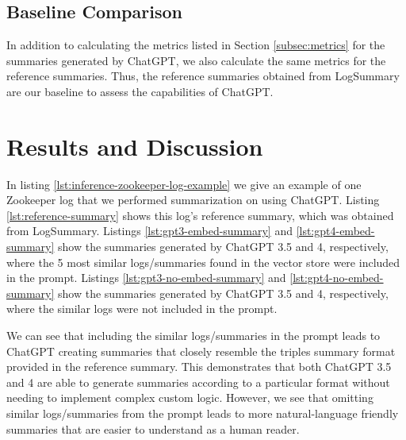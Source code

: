 \documentclass[conference]{IEEEtran}
\begin{document}
\subsection{Baseline Comparison}

In addition to calculating the metrics listed in Section \ref{subsec:metrics} for the summaries generated by ChatGPT, we also calculate the same metrics for the reference summaries. Thus, the reference summaries obtained from LogSummary are our baseline to assess the capabilities of ChatGPT.

\section{Results and Discussion}

In listing \ref{lst:inference-zookeeper-log-example} we give an example of one Zookeeper log that we performed summarization on using ChatGPT. Listing \ref{lst:reference-summary} shows this log's reference summary, which was obtained from LogSummary. Listings \ref{lst:gpt3-embed-summary} and \ref{lst:gpt4-embed-summary} show the summaries generated by ChatGPT 3.5 and 4, respectively, where the 5 most similar logs/summaries found in the vector store were included in the prompt. Listings \ref{lst:gpt3-no-embed-summary} and \ref{lst:gpt4-no-embed-summary} show the summaries generated by ChatGPT 3.5 and 4, respectively, where the similar logs were not included in the prompt.

We can see that including the similar logs/summaries in the prompt leads to ChatGPT creating summaries that closely resemble the triples summary format provided in the reference summary. This demonstrates that both ChatGPT 3.5 and 4 are able to generate summaries according to a particular format without needing to implement complex custom logic. However, we see that omitting similar logs/summaries from the prompt leads to more natural-language friendly summaries that are easier to understand as a human reader.
\end{document}
